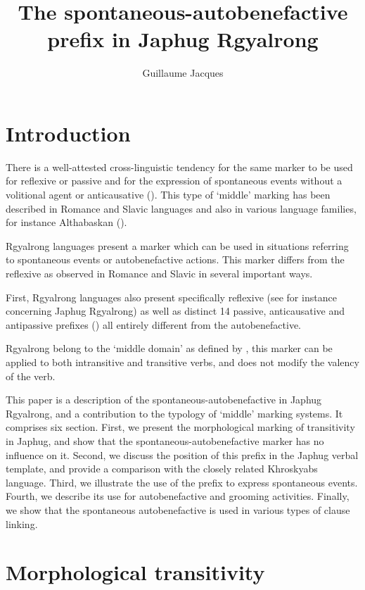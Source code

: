 \documentclass[oldfontcommands,oneside,a4paper,11pt]{article}
\begin{document}
 
 \title{ The spontaneous-autobenefactive prefix in Japhug Rgyalrong
} 
\author{Guillaume Jacques}
\maketitle
\linenumbers


\section{Introduction}
There is a well-attested cross-linguistic tendency for the same marker to be used for reflexive or passive and for the expression of spontaneous events without a volitional agent or anticausative (\citealt[142-144]{kemmer93middle}). This type of `middle' marking has been described in Romance and Slavic languages and also in various language families, for instance Althabaskan (\citealt{thompson96middle}). 

Rgyalrong languages present a marker which can be used in situations referring to  spontaneous events or autobenefactive actions. This marker differs from the reflexive as observed in Romance and Slavic in several important ways.

First, Rgyalrong languages also present specifically reflexive (see for instance \citealt{jacques10refl} concerning Japhug Rgyalrong)   as well as distinct
14 passive, anticausative and antipassive prefixes (\citealt{jacques12demotion}) all entirely different from the autobenefactive.


Rgyalrong belong to the ‘middle domain’ as defined by \citet[15]{kemmer93middle}, this marker can be applied to both intransitive and transitive verbs,  and does not modify the valency of the verb.
 
 This paper is a description of the spontaneous-autobenefactive in Japhug Rgyalrong, and a contribution to the typology of ‘middle’ marking systems. It comprises six section. First, we present the morphological marking  of transitivity in Japhug, and show that the spontaneous-autobenefactive   marker has no influence on it. Second, we discuss the position of this prefix   in the Japhug verbal template, and provide a comparison with the closely   related Khroskyabs language. Third, we illustrate the use of the prefix   to express spontaneous events. Fourth, we describe its use for autobenefactive and grooming activities. Finally, we show that the spontaneous autobenefactive is used in various types of clause linking.


\section{Morphological transitivity}
\end{document}
